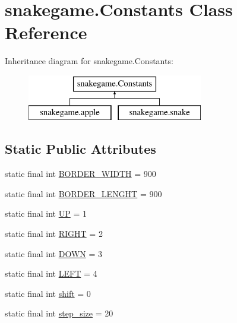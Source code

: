 \hypertarget{classsnakegame_1_1_constants}{}\section{snakegame.\+Constants Class Reference}
\label{classsnakegame_1_1_constants}
Inheritance diagram for snakegame.\+Constants\+:\begin{figure}[H]
\begin{center}
\leavevmode
\includegraphics[height=2.000000cm]{classsnakegame_1_1_constants}
\end{center}
\end{figure}
\subsection*{Static Public Attributes}
\begin{DoxyCompactItemize}
\item 
static final int \mbox{\hyperlink{classsnakegame_1_1_constants_a253f00351ba8bbc4a7e7adf94ddd4a29}{B\+O\+R\+D\+E\+R\+\_\+\+W\+I\+D\+TH}} = 900
\item 
static final int \mbox{\hyperlink{classsnakegame_1_1_constants_a84c010eb1c979612c5b3627964f33385}{B\+O\+R\+D\+E\+R\+\_\+\+L\+E\+N\+G\+HT}} = 900
\item 
static final int \mbox{\hyperlink{classsnakegame_1_1_constants_a47ff3bd3c0ecae5e9f2b878915a9dad2}{UP}} = 1
\item 
static final int \mbox{\hyperlink{classsnakegame_1_1_constants_affe932cca510cf5d5f619af355a9e5e2}{R\+I\+G\+HT}} = 2
\item 
static final int \mbox{\hyperlink{classsnakegame_1_1_constants_ac9166aad2f05da4e80661a252c82f9f6}{D\+O\+WN}} = 3
\item 
static final int \mbox{\hyperlink{classsnakegame_1_1_constants_af2ce3ce8082b3922ef73a7cd291095d7}{L\+E\+FT}} = 4
\item 
static final int \mbox{\hyperlink{classsnakegame_1_1_constants_a112d1c18a610f11804c7e27734db6a40}{shift}} = 0
\item 
static final int \mbox{\hyperlink{classsnakegame_1_1_constants_a3c24c7aa6b732df3fd18eaf1394f9255}{step\+\_\+size}} = 20
\end{DoxyCompactItemize}



